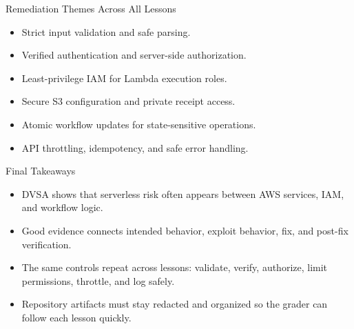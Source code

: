 \documentclass[aspectratio=169,11pt]{beamer}
\begin{document}
\begin{frame}{Remediation Themes Across All Lessons}
  \begin{itemize}
    \item Strict input validation and safe parsing.
    \item Verified authentication and server-side authorization.
    \item Least-privilege IAM for Lambda execution roles.
    \item Secure S3 configuration and private receipt access.
    \item Atomic workflow updates for state-sensitive operations.
    \item API throttling, idempotency, and safe error handling.
  \end{itemize}
\end{frame}

\begin{frame}{Final Takeaways}
  \begin{itemize}
    \item DVSA shows that serverless risk often appears between AWS services, IAM, and workflow logic.
    \item Good evidence connects intended behavior, exploit behavior, fix, and post-fix verification.
    \item The same controls repeat across lessons: validate, verify, authorize, limit permissions, throttle, and log safely.
    \item Repository artifacts must stay redacted and organized so the grader can follow each lesson quickly.
  \end{itemize}
\end{frame}
\end{document}
